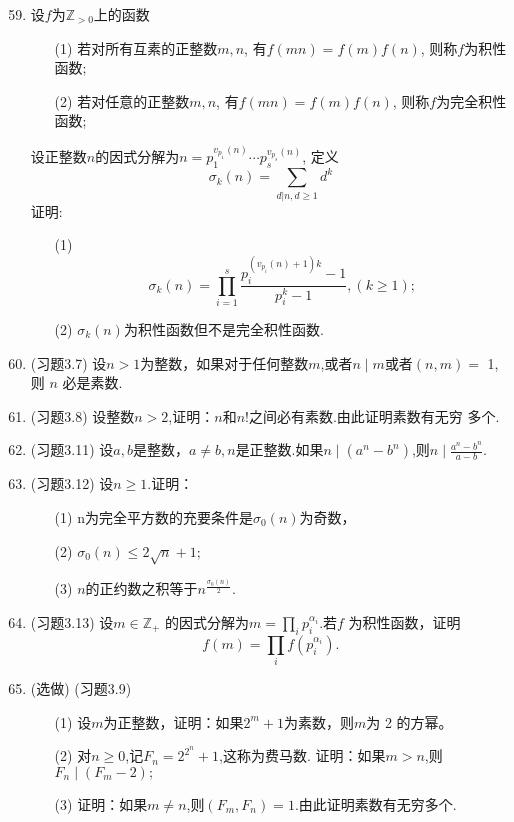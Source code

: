 \documentclass[a4paper,12pt]{article}
\begin{document}
\begin{enumerate}\setcounter{enumi}{58}
 \item 设$f$为$\mathbb{Z}_{>0}$上的函数
 \begin{itemize}
 \item[(1)] 若对所有互素的正整数$m,n$, 有$f(mn)=f(m)f(n)$, 则称$f$为积性函数;
 \item[(2)] 若对任意的正整数$m,n$, 有$f(mn)=f(m)f(n)$, 则称$f$为完全积性函数;
 \end{itemize}
 设正整数$n$的因式分解为$n=p_1^{v_{p_1}(n)}\cdots p_s^{v_{p_s}(n)}$, 定义
 $$\sigma_k(n)=\sum_{d|n,d\geq 1}d^k$$
 证明:
 \begin{itemize}
 \item[(1)] $$\sigma_k(n)=\prod_{i=1}^s\frac{p_i^{(v_{p_i}(n)+1)k}-1}{p_i^k-1},(k\geq 1);$$
 \item[(2)] $\sigma_k(n)$为积性函数但不是完全积性函数.
 \end{itemize}
 \item (习题3.7) 设$n> 1$为整数，如果对于任何整数$m$,或者$n\mid m$或者$(n,m)=$
1,则 $n$ 必是素数.
 \item (习题3.8) 设整数$n>2$,证明：$n$和$n!$之间必有素数.由此证明素数有无穷
多个.
 \item (习题3.11) 设$a,b$是整数，$a\neq b,n$是正整数.如果$n\mid(a^n-b^n)$,则$n\mid\frac{a^n-b^n}{a-b}.$
 \item (习题3.12) 设$n\geqslant1.$证明：
  \begin{itemize}
\item[(1)] n为完全平方数的充要条件是$\sigma _0( n)$为奇数，
\item[(2)] $\sigma _0( n) \leqslant 2\sqrt {n}+ 1;$
\item[(3)] $n$的正约数之积等于$n^\frac{\sigma_0(n)}2.$
\end{itemize}
 \item (习题3.13) 设$m\in\mathbb{Z}_+$ 的因式分解为$m=\prod_ip_i^{\alpha_i}$.若$f$ 为积性函数，证明
$$f(m)=\prod_if(p_i^{\alpha_i}).$$
 \item {\color{red} (选做)} (习题3.9)
 \begin{itemize}
 \item[(1)]设$m$为正整数，证明：如果$2^m+1$为素数，则$m$为 2 的方幂。
\item[(2)]对$n\geqslant0$,记$F_n=2^{2^n}+1$,这称为费马数. 证明：如果$m>n$,则
$F_n\mid(F_m-2);$
\item[(3)]证明：如果$m\neq n$,则$(F_m,F_n)=1.$由此证明素数有无穷多个.
 \end{itemize}
 

\end{enumerate}
\end{document}
